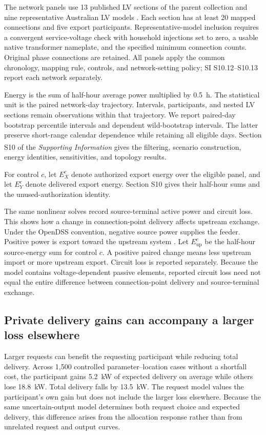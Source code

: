 \documentclass[twoside,twocolumn,9pt]{article}
\newcommand{\suppref}{\textit{Supporting Information}\textsuperscript{\dag}}
\begin{document}
{The network panels use 13 published LV sections of the parent collection and
nine representative Australian LV models \cite{geth2021lvtaxonomy}.
Each section has at least 20 mapped connections and five export participants.
Representative-model inclusion requires a convergent service-voltage check
with household injections set to zero, a usable native transformer nameplate,
and the specified minimum connection counts. Original phase connections are
retained. All panels apply the common chronology, mapping rule, controls, and
network-setting policy; SI S10.12--S10.13 report each network separately.

Energy is the sum of half-hour average power multiplied by 0.5~h. The
statistical unit is the paired network-day trajectory. Intervals, participants,
and nested LV sections remain observations within that trajectory. We report
paired-day bootstrap percentile intervals and dependent wild-bootstrap
intervals. The latter preserve short-range calendar dependence while retaining
all eligible days.
Section S10 of the \suppref{} gives the filtering, scenario construction,
energy identities, sensitivities, and topology results.

For control $c$, let $E_X^c$ denote authorized export energy over the eligible
panel, and let $E_Y^c$ denote delivered export energy. Section S10 gives their
half-hour sums and the unused-authorization identity.

The same nonlinear solves record source-terminal active power and circuit loss.
This shows how a change in connection-point delivery affects upstream exchange. Under
the OpenDSS convention, negative source power supplies the feeder. Positive
power is export toward the upstream system \cite{epriOpenDSSTotalPower}. Let
$E_{\mathrm{up}}^c$ be the half-hour source-energy sum for control $c$. A
positive paired change means less upstream import or more upstream export.
Circuit loss is reported separately. Because the model contains
voltage-dependent passive elements, reported circuit loss need not equal the
entire difference between connection-point delivery and source-terminal exchange.
}

\subsection{Private delivery gains can accompany a larger loss elsewhere}
\label{sec:behavioral_results}

Larger requests can benefit the requesting participant while reducing total
delivery. Across 1,500 controlled parameter--location cases without a shortfall
cost, the participant gains 5.2~kW of expected delivery on average while others
lose 18.8~kW. Total delivery falls by 13.5~kW. The request model values the
participant's own gain but does not include the larger loss elsewhere. Because
the same uncertain-output model determines both request choice and expected
delivery, this difference arises from the allocation response rather than from
unrelated request and output curves.
\end{document}
